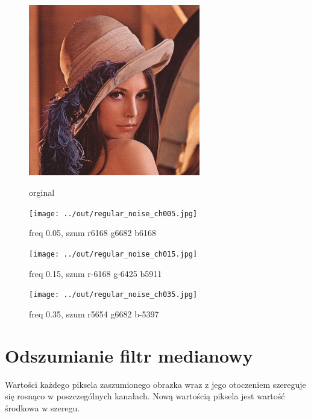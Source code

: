 \documentclass[a4paper,12pt]{article}
\begin{document}
\begin{figure}[h!]
\begin{minipage}[t]{7.5cm}
\begin{center}
\includegraphics[width=7.5cm,clip]{../../lena.jpg}
\caption{orginal}
\end{center}
\end{minipage}
\hfill
\begin{minipage}[t]{7.5cm}
\begin{center}
\texttt{[image: ../out/regular\_noise\_ch005.jpg]}
\caption{freq 0.05, szum r6168 g6682 b6168}
\end{center}
\end{minipage}
\end{figure}

\begin{figure}[h!]
\begin{minipage}[t]{7.5cm}
\begin{center}
\texttt{[image: ../out/regular\_noise\_ch015.jpg]}
\caption{freq 0.15, szum r-6168 g-6425 b5911}
\end{center}
\end{minipage}
\hfill
\begin{minipage}[t]{7.5cm}
\begin{center}
\texttt{[image: ../out/regular\_noise\_ch035.jpg]}
\caption{freq 0.35, szum r5654 g6682 b-5397}
\end{center}
\end{minipage}
\end{figure}

\newpage
\section{Odszumianie filtr medianowy}
Wartości każdego piksela zaszumionego obrazka wraz z jego otoczeniem szereguje się rosnąco w poszczególnych kanałach. Nową wartością piksela jest wartość środkowa w szeregu.
\end{document}

